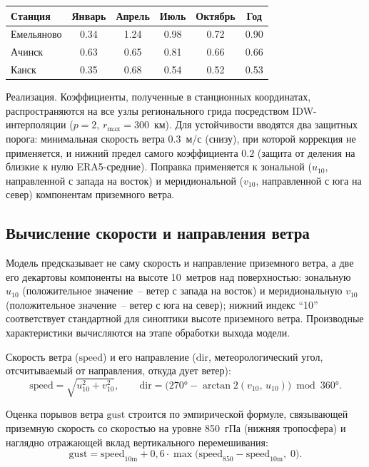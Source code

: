 \documentclass[14pt,a4paper]{extarticle}
\newcounter{none}
\numberwithin{table}{section}
\numberwithin{figure}{section}
\numberwithin{equation}{section}
\begin{document}
{\def\LTcaptype{none}
\begin{longtable}[]{@{}lccccc@{}}
\toprule\noalign{}
Станция & Январь & Апрель & Июль & Октябрь & Год \\
\midrule\noalign{}
\endhead
\bottomrule\noalign{}
\endlastfoot
Емельяново & 0.34 & 1.24 & 0.98 & 0.72 & 0.90 \\
Ачинск & 0.63 & 0.65 & 0.81 & 0.66 & 0.66 \\
Канск & 0.35 & 0.68 & 0.54 & 0.52 & 0.53 \\
\end{longtable}
}

Реализация. Коэффициенты, полученные в станционных
координатах, распространяются на все узлы регионального грида
посредством IDW-интерполяции (\(p=2\), \(r_{\max}=300\)~км). Для
устойчивости вводятся два защитных порога: минимальная скорость ветра
$0.3$~м/с (снизу), при которой коррекция не применяется, и нижний
предел самого коэффициента $0.2$ (защита от деления на близкие к нулю
ERA5-средние). Поправка применяется к зональной ($u_{10}$, направленной
с запада на восток) и меридиональной ($v_{10}$, направленной с юга на
север) компонентам приземного ветра.

\subsection{Вычисление скорости и направления
ветра}\label{wind-speed-direction}

Модель предсказывает не саму скорость и направление приземного ветра,
а две его декартовы компоненты на высоте 10~метров над поверхностью:
зональную $u_{10}$ (положительное значение~-- ветер с запада на восток)
и меридиональную $v_{10}$ (положительное значение~-- ветер с юга на север);
нижний индекс ``10'' соответствует стандартной для синоптики высоте
приземного ветра. Производные характеристики вычисляются на этапе
обработки выхода модели.

Скорость ветра ($\text{speed}$) и его направление
($\text{dir}$, метеорологический угол, отсчитываемый от направления, откуда
дует ветер):
\[
  \text{speed} = \sqrt{u_{10}^2 + v_{10}^2}, \qquad
  \text{dir} = \bigl(270° - \arctan2(v_{10},\, u_{10})\bigr) \bmod 360°.
\]

Оценка порывов ветра $\text{gust}$ строится по эмпирической формуле,
связывающей приземную скорость со скоростью на уровне 850~гПа
(нижняя тропосфера) и наглядно отражающей вклад вертикального
перемешивания:
\[
  \text{gust} = \text{speed}_{10\text{m}} + 0{,}6 \cdot
  \max\!\bigl(\text{speed}_{850} - \text{speed}_{10\text{m}},\; 0\bigr).
\]
\end{document}
